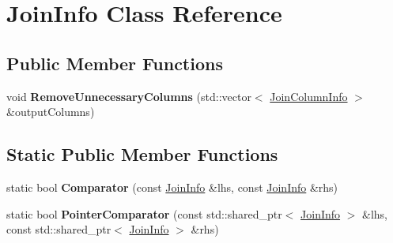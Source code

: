 \hypertarget{class_join_info}{\section{Join\+Info Class Reference}
\label{class_join_info}
}
\subsection*{Public Member Functions}
\begin{DoxyCompactItemize}
\item 
\hypertarget{class_join_info_aa4c03bd8c1d0a7f4a5b89287d69f89b5}{void {\bfseries Remove\+Unnecessary\+Columns} (std\+::vector$<$ \hyperlink{class_join_column_info}{Join\+Column\+Info} $>$ \&output\+Columns)}\label{class_join_info_aa4c03bd8c1d0a7f4a5b89287d69f89b5}

\end{DoxyCompactItemize}
\subsection*{Static Public Member Functions}
\begin{DoxyCompactItemize}
\item 
\hypertarget{class_join_info_a133e207c2642a61245a1152414ff4918}{static bool {\bfseries Comparator} (const \hyperlink{class_join_info}{Join\+Info} \&lhs, const \hyperlink{class_join_info}{Join\+Info} \&rhs)}\label{class_join_info_a133e207c2642a61245a1152414ff4918}

\item 
\hypertarget{class_join_info_a06c71078ad1716a98122f06f6b55f234}{static bool {\bfseries Pointer\+Comparator} (const std\+::shared\+\_\+ptr$<$ \hyperlink{class_join_info}{Join\+Info} $>$ \&lhs, const std\+::shared\+\_\+ptr$<$ \hyperlink{class_join_info}{Join\+Info} $>$ \&rhs)}\label{class_join_info_a06c71078ad1716a98122f06f6b55f234}

\end{DoxyCompactItemize}
